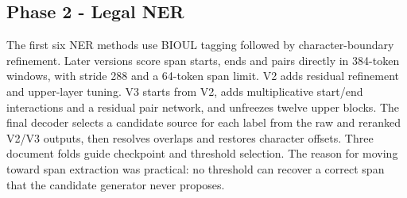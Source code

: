 \subsection{Phase 2 - Legal NER}
The first six NER methods use BIOUL tagging followed by character-boundary refinement. Later versions score span starts, ends and pairs directly in 384-token windows, with stride 288 and a 64-token span limit. V2 adds residual refinement and upper-layer tuning. V3 starts from V2, adds multiplicative start/end interactions and a residual pair network, and unfreezes twelve upper blocks. The final decoder selects a candidate source for each label from the raw and reranked V2/V3 outputs, then resolves overlaps and restores character offsets. Three document folds guide checkpoint and threshold selection. The reason for moving toward span extraction was practical: no threshold can recover a correct span that the candidate generator never proposes.
